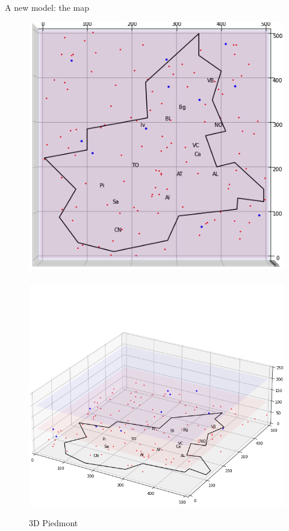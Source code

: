 \documentclass[9pt]{beamer}
\begin{document}
\begin{frame}{A new model: the map}

\begin{figure}[H]
\center
\includegraphics[scale=0.25]{Piem1.png}~~~~~~~~~\includegraphics[scale=0.25]{Piem2.png} 

\caption{3D Piedmont} 
\label{Piem}
\end{figure}

\end{frame}
\end{document}
